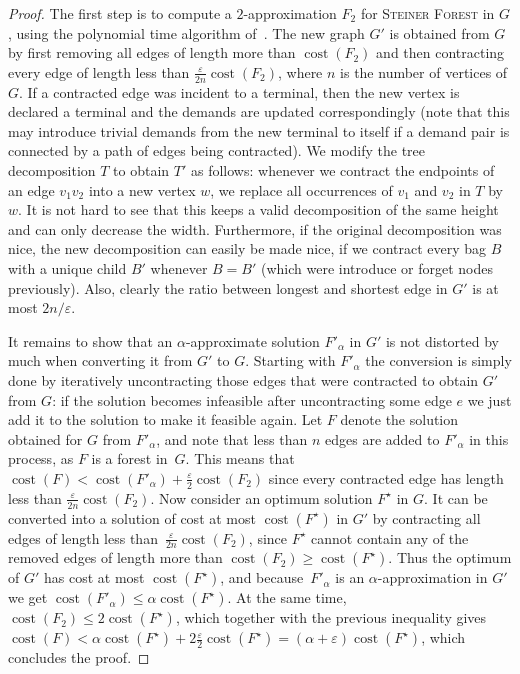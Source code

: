 \documentclass[a4paper]{article}
\theoremstyle{plain}
\newcommand{\eps}{{\varepsilon}}
\newcommand{\pname}[1]{\textsc{#1}}
\DeclareMathOperator{\cost}{cost}
\newcommand{\SF}{\pname{Steiner Forest}\xspace}
\begin{document}
%
\begin{proof}%
The first
step is to compute a $2$-approximation $F_2$ for \SF in $G$, using the
polynomial time algorithm of~\cite{agrawal1991trees}.  The new graph $G'$ is
obtained from $G$ by first removing all edges of length more than $\cost(F_2)$
and then contracting every edge of length less than
$\frac{\eps}{2n}\cost(F_2)$, where $n$ is the number of vertices of $G$.  If a
contracted edge was incident to a terminal, then the new vertex is declared a
terminal and the demands are updated correspondingly (note that this may
introduce trivial demands from the new terminal to itself if a demand pair is
connected by a path of edges being contracted).  We modify the tree
decomposition $T$ to obtain $T'$ as follows: whenever we contract the endpoints
of an edge $v_1v_2$ into a new vertex $w$, we replace all occurrences of $v_1$
and $v_2$ in $T$ by $w$. It is not hard to see that this keeps a valid decomposition
of the same height and can only decrease the width. Furthermore, if the
original decomposition was nice, the new decomposition can easily be made nice, 
if we contract every bag $B$ with a unique child $B'$
whenever $B=B'$ (which were introduce or forget nodes previously). 
Also, clearly the ratio between longest and shortest edge in
$G'$ is at most $2n/\eps$.

It remains to show that an $\alpha$-approximate solution $F'_\alpha$ in $G'$ is not distorted by much when converting it 
from $G'$ to $G$. Starting with $F'_\alpha$ the conversion is simply done by iteratively uncontracting those edges that were contracted to obtain $G'$ from $G$: 
if the solution becomes infeasible after uncontracting some edge $e$ we just add it to the solution to make it feasible again. 
Let $F$ denote the solution obtained for $G$ from $F'_\alpha$, and note that less than $n$ edges are added to $F'_\alpha$ in this process, as $F$ is a forest in~$G$.
This means that $\cost(F)<\cost(F'_\alpha)+\frac{\eps}{2}\cost(F_2)$ since every contracted edge has length less than $\frac{\eps}{2n}\cost(F_2)$.
Now consider an optimum solution $F^\star$ in $G$. It can be converted into a solution of cost at most $\cost(F^\star)$ in $G'$ by contracting all edges of length less than~$\frac{\eps}{2n}\cost(F_2)$, 
since $F^\star$ cannot contain any of the removed edges of length more than $\cost(F_2)\geq\cost(F^\star)$.
Thus the optimum of $G'$ has cost at most $\cost(F^\star)$, and because~$F'_\alpha$ is an $\alpha$-approximation in $G'$ we get $\cost(F'_\alpha)\leq\alpha\cost(F^\star)$. 
At the same time, $\cost(F_2)\leq 2\cost(F^\star)$, which together with the previous inequality gives 
$\cost(F)<\alpha\cost(F^\star)+2\frac{\eps}{2}\cost(F^\star)=(\alpha+\eps)\cost(F^\star)$, which concludes the proof.
\end{proof}    
%
\end{document}
